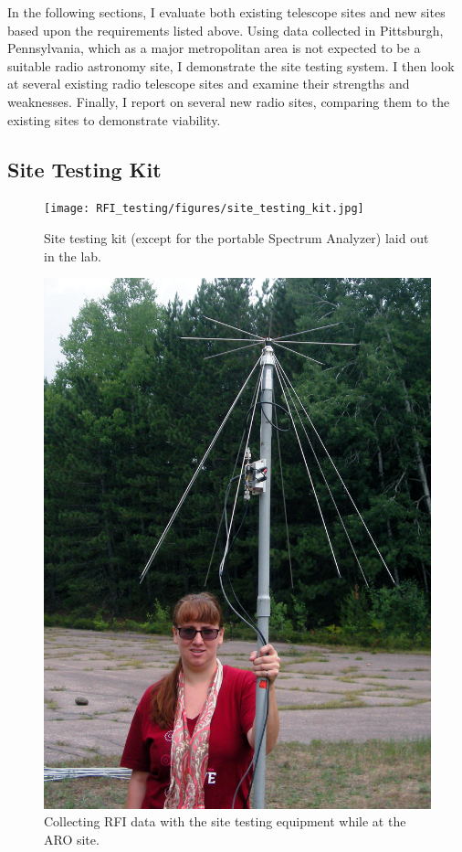 In the following sections, I evaluate both existing telescope sites and new sites based upon the requirements listed above. Using data collected in Pittsburgh, Pennsylvania, which as a major metropolitan area is not expected to be a suitable radio astronomy site, I demonstrate the site testing system. I then look at several existing radio telescope sites and examine their strengths and weaknesses. Finally, I report on several new radio sites, comparing them to the existing sites to demonstrate viability. 

\subsection{Site Testing Kit}

\begin{figure}[htb]
\centering
\begin{minipage}[b]{0.47\textwidth}
\centering
\texttt{[image: RFI\_testing/figures/site\_testing\_kit.jpg]}
\caption{Site testing kit (except for the portable Spectrum Analyzer) laid out in the lab.}
\label{Fig:site_kit}
\end{minipage}%
\begin{minipage}[b]{0.02\textwidth}
\hspace{1cm}
\end{minipage}%
\begin{minipage}[b]{0.47\textwidth}
\centering
\includegraphics[width=0.95\linewidth]{RFI_testing/figures/voytek_site_test_alg.jpg}
\caption{Collecting RFI data with the site testing equipment while at the ARO site.}
\label{Fig:aroant}
\end{minipage}
\end{figure}

